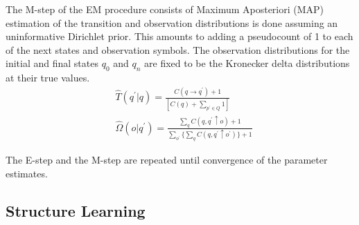\documentclass[letterpaper]{article}
\begin{document}
The M-step of the EM procedure consists of 
Maximum Aposteriori (MAP) estimation of the 
transition and observation distributions is done 
assuming an uninformative Dirichlet prior. This 
amounts to 
adding a pseudocount of 1 to each of the next states and observation 
symbols. 
The observation distributions for the initial and final states $q_0$ and 
$q_n$ are fixed to be the Kronecker delta distributions at their true values. 
{\footnotesize
\begin{align}
&\hat{T}(q^\prime | q) = \frac{ C(q \rightarrow q^\prime) + 1}{[C(q)+ \sum_{p^{\prime} \in Q} 1]} \\
&\hat{\Omega}(o|q^\prime) = \frac {{\sum_{q} C(q, q^\prime \uparrow o)} + 1} {\sum_{o^\prime} \{ \sum_q C(q,q^\prime \uparrow o^\prime)\} + 1} 
\end{align}
\vspace{-.1in}
}%

The E-step and the M-step are repeated until convergence of the 
parameter estimates.

\subsection{Structure Learning}
\vspace{-.05in}
\label{struct}
\end{document}
